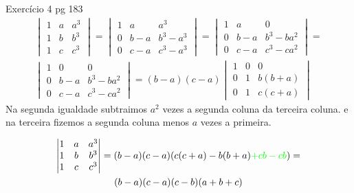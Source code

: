 \documentclass{beamer}
\begin{document}
\begin{frame}{Exercício 4 pg 183}
  \begin{gather*}
    \begin{vmatrix}
      1 & a & a^3 \\
      1 & b & b^3 \\
      1 & c & c^3
    \end{vmatrix} = \begin{vmatrix}
      1 & a & a^3 \\
      0& b-a & b^3-a^3 \\
      0 & c-a & c^3-a^3
    \end{vmatrix} = \begin{vmatrix}
      1 & a & 0 \\
      0 & b-a & b^3 -ba^2 \\
      0 & c-a & c^3 -ca^2
    \end{vmatrix} = \\
   \begin{vmatrix}
    1 & 0 & 0 \\
    0 & b-a & b^3 -ba^2 \\
    0 & c-a & c^3 -ca^2
  \end{vmatrix} = (b-a)(c-a) \begin{vmatrix}
    1 & 0& 0 \\
    0 & 1 & b(b+a) \\
    0 & 1 & c(c+a)
  \end{vmatrix}
  \end{gather*}
  Na segunda igualdade subtraimos $a^2$ vezes a segunda coluna da terceira coluna.
  e na terceira fizemos a segunda coluna menos $a$ vezes a primeira.
\end{frame}
\begin{frame}
 \begin{gather*} \begin{vmatrix}
    1 & a & a^3 \\
    1 & b & b^3 \\
    1 & c & c^3
  \end{vmatrix} = (b-a)(c-a)(c(c+a)-b(b+a) \textcolor{green}{+cb -cb})= \\
  (b-a)(c-a)(c-b)(a+b+c)
\end{gather*}
\end{frame}
\end{document}
